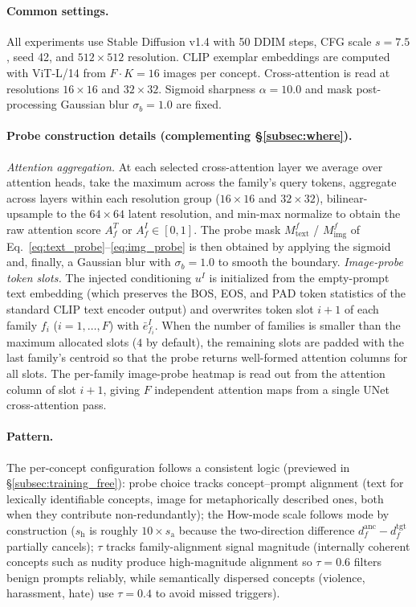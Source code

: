 \paragraph{Common settings.} All experiments use Stable Diffusion v1.4 with 50 DDIM steps, CFG scale $s{=}7.5$, seed 42, and $512{\times}512$ resolution. CLIP exemplar embeddings are computed with ViT-L/14 from $F\cdot K{=}16$ images per concept. Cross-attention is read at resolutions $16{\times}16$ and $32{\times}32$. Sigmoid sharpness $\alpha{=}10.0$ and mask post-processing Gaussian blur $\sigma_b{=}1.0$ are fixed.

\paragraph{Probe construction details (complementing \S\ref{subsec:where}).}
\emph{Attention aggregation.} At each selected cross-attention layer we average over attention heads, take the maximum across the family's query tokens, aggregate across layers within each resolution group ($16{\times}16$ and $32{\times}32$), bilinear-upsample to the $64{\times}64$ latent resolution, and min-max normalize to obtain the raw attention score $A^{T}_f$ or $A^{I}_f \in [0,1]$. The probe mask $M^{f}_{\text{text}}$ / $M^{f}_{\text{img}}$ of Eq.~\ref{eq:text_probe}--\ref{eq:img_probe} is then obtained by applying the sigmoid and, finally, a Gaussian blur with $\sigma_b{=}1.0$ to smooth the boundary.
\emph{Image-probe token slots.} The injected conditioning $u^{I}$ is initialized from the empty-prompt text embedding (which preserves the BOS, EOS, and PAD token statistics of the standard CLIP text encoder output) and overwrites token slot $i{+}1$ of each family $f_i$ ($i{=}1,\dots,F$) with $\bar{e}^{I}_{f_i}$. When the number of families is smaller than the maximum allocated slots ($4$ by default), the remaining slots are padded with the last family's centroid so that the probe returns well-formed attention columns for all slots. The per-family image-probe heatmap is read out from the attention column of slot $i{+}1$, giving $F$ independent attention maps from a single UNet cross-attention pass.

\paragraph{Pattern.} The per-concept configuration follows a consistent logic (previewed in \S\ref{subsec:training_free}): probe choice tracks concept--prompt alignment (text for lexically identifiable concepts, image for metaphorically described ones, both when they contribute non-redundantly); the How-mode scale follows mode by construction ($s_\text{h}$ is roughly $10{\times}s_\text{a}$ because the two-direction difference $d^{\text{anc}}_f - d^{\text{tgt}}_f$ partially cancels); $\tau$ tracks family-alignment signal magnitude (internally coherent concepts such as nudity produce high-magnitude alignment so $\tau{=}0.6$ filters benign prompts reliably, while semantically dispersed concepts (violence, harassment, hate) use $\tau{=}0.4$ to avoid missed triggers).

